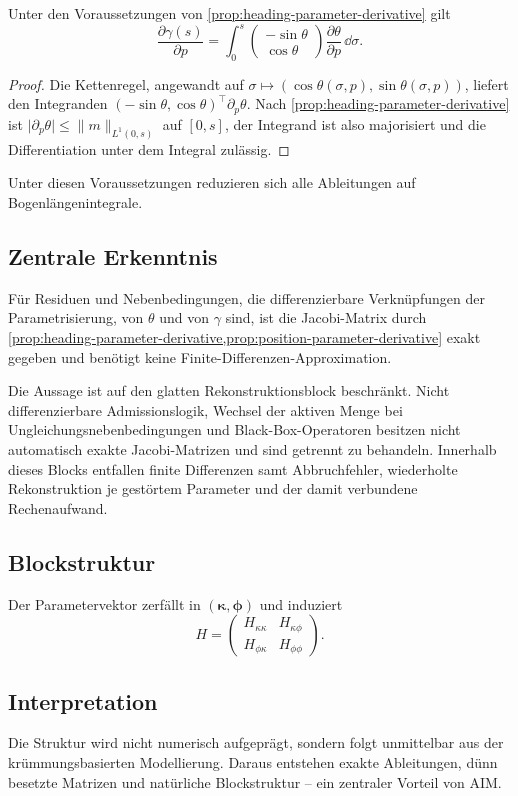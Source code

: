 \begin{proposition}
\label{prop:position-parameter-derivative}
Unter den Voraussetzungen von \cref{prop:heading-parameter-derivative} gilt
\[
\frac{\partial\gamma(s)}{\partial p}
=\int_0^s
\begin{pmatrix}-\sin\theta\\\cos\theta\end{pmatrix}
\frac{\partial\theta}{\partial p}\,\dd\sigma.
\]
\end{proposition}
\begin{proof}
Die Kettenregel, angewandt auf
\(\sigma\mapsto(\cos\theta(\sigma,p),\sin\theta(\sigma,p))\), liefert den
Integranden \((-\sin\theta,\cos\theta)^{\!\top}\partial_p\theta\). Nach
\cref{prop:heading-parameter-derivative} ist
\(\lvert\partial_p\theta\rvert\le\lVert m\rVert_{L^1(0,s)}\) auf \([0,s]\),
der Integrand ist also majorisiert und die Differentiation unter dem
Integral zulässig.
\end{proof}
Unter diesen Voraussetzungen reduzieren sich alle Ableitungen auf
Bogenlängenintegrale.

\subsection{Zentrale Erkenntnis}
\begin{proposition}
\label{prop:exact-jacobians-smooth-block}
Für Residuen und Nebenbedingungen, die differenzierbare Verknüpfungen der
Parametrisierung, von \(\theta\) und von \(\gamma\) sind, ist die
Jacobi-Matrix durch
\cref{prop:heading-parameter-derivative,prop:position-parameter-derivative}
exakt gegeben und benötigt keine Finite-Differenzen-Approximation.
\end{proposition}
Die Aussage ist auf den glatten Rekonstruktionsblock beschränkt. Nicht
differenzierbare Admissionslogik, Wechsel der aktiven Menge bei
Ungleichungsnebenbedingungen und Black-Box-Operatoren besitzen nicht
automatisch exakte Jacobi-Matrizen und sind getrennt zu behandeln.
Innerhalb dieses Blocks entfallen finite Differenzen samt
Abbruchfehler, wiederholte Rekonstruktion je gestörtem Parameter und der
damit verbundene Rechenaufwand.

\subsection{Blockstruktur}
Der Parametervektor zerfällt in \((\boldsymbol\kappa,\boldsymbol\phi)\) und
induziert
\[
H=\begin{pmatrix}
H_{\kappa\kappa}&H_{\kappa\phi}\\
H_{\phi\kappa}&H_{\phi\phi}
\end{pmatrix}.
\]

\subsection{Interpretation}
\begin{summary}
Die Struktur wird nicht numerisch aufgeprägt, sondern folgt unmittelbar aus
der krümmungsbasierten Modellierung. Daraus entstehen exakte Ableitungen, dünn
besetzte Matrizen und natürliche Blockstruktur -- ein zentraler Vorteil von AIM.
\end{summary}
